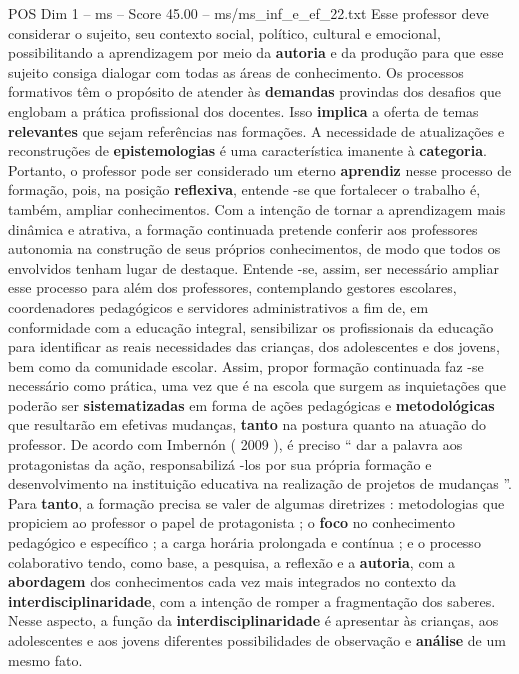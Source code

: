 \begin{textsample}{POS Dim 1 – ms – Score 45.00 – ms/ms\_inf\_e\_ef\_22.txt}
Esse professor deve considerar o sujeito, seu contexto social, político, cultural e emocional, possibilitando a aprendizagem por meio da \textbf{autoria} e da produção para que esse sujeito consiga dialogar com todas as áreas de conhecimento.
Os processos formativos têm o propósito de atender às \textbf{demandas} provindas dos desafios que englobam a prática profissional dos docentes.
Isso \textbf{implica} a oferta de temas \textbf{relevantes} que sejam referências nas formações.
A necessidade de atualizações e reconstruções de \textbf{epistemologias} é uma característica imanente à \textbf{categoria}.
Portanto, o professor pode ser considerado um eterno \textbf{aprendiz} nesse processo de formação, pois, na posição \textbf{reflexiva}, entende -se que fortalecer o trabalho é, também, ampliar conhecimentos.
Com a intenção de tornar a aprendizagem mais dinâmica e atrativa, a formação continuada pretende conferir aos professores autonomia na construção de seus próprios conhecimentos, de modo que todos os envolvidos tenham lugar de destaque.
Entende -se, assim, ser necessário ampliar esse processo para além dos professores, contemplando gestores escolares, coordenadores pedagógicos e servidores administrativos a fim de, em conformidade com a educação integral, sensibilizar os profissionais da educação para identificar as reais necessidades das crianças, dos adolescentes e dos jovens, bem como da comunidade escolar.
Assim, propor formação continuada faz -se necessário como prática, uma vez que é na escola que surgem as inquietações que poderão ser \textbf{sistematizadas} em forma de ações pedagógicas e \textbf{metodológicas} que resultarão em efetivas mudanças, \textbf{tanto} na postura quanto na atuação do professor.
De acordo com Imbernón ( 2009 ), é preciso “ dar a palavra aos protagonistas da ação, responsabilizá -los por sua própria formação e desenvolvimento na instituição educativa na realização de projetos de mudanças ”.
Para \textbf{tanto}, a formação precisa se valer de algumas diretrizes : metodologias que propiciem ao professor o papel de protagonista ; o \textbf{foco} no conhecimento pedagógico e específico ; a carga horária prolongada e contínua ; e o processo colaborativo tendo, como base, a pesquisa, a reflexão e a \textbf{autoria}, com a \textbf{abordagem} dos conhecimentos cada vez mais integrados no contexto da \textbf{interdisciplinaridade}, com a intenção de romper a fragmentação dos saberes.
Nesse aspecto, a função da \textbf{interdisciplinaridade} é apresentar às crianças, aos adolescentes e aos jovens diferentes possibilidades de observação e \textbf{análise} de um mesmo fato.

\end{textsample}
